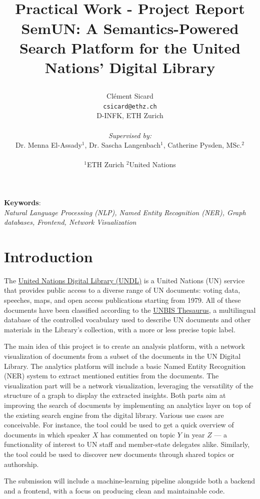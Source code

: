 \documentclass[11pt]{article}
\title{
\centering
\begin{minipage}{4cm}
    \centering
    
\end{minipage}
\hfill %
\begin{minipage}{4cm}
    \centering
    
\end{minipage}\\[1cm] %
{\large Practical Work - Project Report}\\
\textbf{SemUN: A Semantics-Powered Search Platform for the United Nations' Digital Library}
}
\author{
    Clément Sicard\\
    \texttt{csicard@ethz.ch}\\
    D-INFK, ETH Zurich\\
    \\ 
    \textit{Supervised by:}\\
    Dr. Menna El-Assady$^1$, Dr. Sascha Langenbach$^1$, Catherine Pysden, MSc.$^2$\\
    \\
    $^1$ETH Zurich $^2$United Nations
}
\begin{document}
\maketitle

\begin{center}
	\small\textbf{Keywords}:\\
        \textit{
            Natural Language Processing (NLP), 
            Named Entity Recognition (NER), 
            Graph databases,
            Frontend,
            Network Visualization
        }
\end{center}

\section{Introduction} \label{intro}
The \href{https://digitallibrary.un.org/}{United Nations Digital Library (UNDL)} is a United Nations (UN) service that provides public access to a diverse range of UN documents: voting data, speeches, maps, and open access publications starting from 1979.
All of these documents have been classified according to the \href{https://metadata.un.org/thesaurus/about?lang=en}{UNBIS Thesaurus}, a multilingual database of the controlled vocabulary used to describe UN documents and other materials in the Library's collection, with a more or less precise topic label.

The main idea of this project is to create an analysis platform, with a network visualization of documents from a subset of the documents in the UN Digital Library. The analytics platform will include a basic Named Entity Recognition (NER) system to extract mentioned entities from the documents. The visualization part will be a network visualization, leveraging the versatility of the structure of a graph to display the extracted insights. Both parts aim at improving the search of documents by implementing an analytics layer on top of the existing search engine from the digital library. Various use cases are conceivable. For instance, the tool could be used to get a quick overview of documents in which speaker $X$ has commented on topic $Y$ in year $Z$ --- a functionality of interest to UN staff and member-state delegates alike. Similarly, the tool could be used to discover new documents through shared topics or authorship. 

The submission will include a machine-learning pipeline alongside both a backend and a frontend, with a focus on producing clean and maintainable code.
\end{document}
